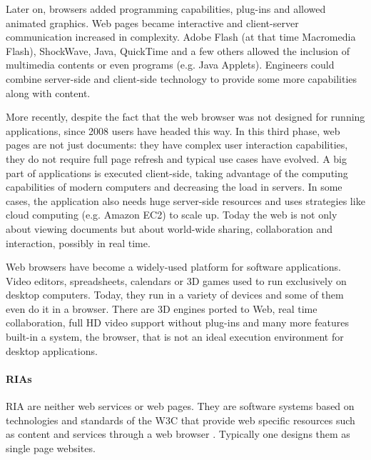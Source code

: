 Later on, browsers added programming capabilities, plug-ins and allowed animated graphics. Web pages became interactive and client-server communication increased in complexity.
Adobe Flash (at that time Macromedia Flash), ShockWave, Java, QuickTime and a few others allowed the inclusion of multimedia contents or even programs (e.g. Java Applets).
Engineers could combine server-side and client-side technology to provide some more capabilities along with content.

More recently, despite the fact that the web browser was not designed for running applications, since 2008 users have headed this way. 
In this third phase, web pages are not just documents: they have complex user interaction capabilities, they do not require full page refresh and typical use cases have evolved. 
A big part of applications is executed client-side, taking advantage of the computing capabilities of modern computers and decreasing the load in servers. In some cases, the application also needs huge server-side resources and uses strategies like cloud computing (e.g. Amazon EC2) to scale up.
Today the web is not only about viewing documents but about world-wide sharing, collaboration and interaction, possibly in real time. 

Web browsers have become a widely-used platform for software applications. 
Video editors, spreadsheets, calendars or 3D games used to run exclusively on desktop computers. 
Today, they run in a variety of devices and some of them even do it in a browser. 
There are 3D engines ported to Web, real time collaboration, full HD video support without plug-ins and many more features built-in a system, the browser, that is not an ideal execution environment for desktop applications.

\paragraph{\acp{RIA}}
\acs{RIA} are neither web services or web pages. 
They are software systems based on technologies and standards of the \ac{W3C} that provide web specific resources such as content and services through a web browser \cite{Kappel:2006}.
Typically one designs them as single page websites.

